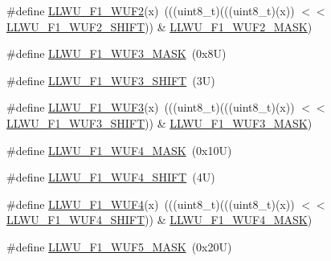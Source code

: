 \begin{DoxyCompactItemize}
\#define \mbox{\hyperlink{group___l_l_w_u___register___masks_ga7baf252acb15c1af560212b69c4510b2}{L\+L\+W\+U\+\_\+\+F1\+\_\+\+W\+U\+F2}}(x)~(((uint8\+\_\+t)(((uint8\+\_\+t)(x)) $<$$<$ \mbox{\hyperlink{group___l_l_w_u___register___masks_gab99e1778fd26ccd69f31a56d94709e41}{L\+L\+W\+U\+\_\+\+F1\+\_\+\+W\+U\+F2\+\_\+\+S\+H\+I\+FT}})) \& \mbox{\hyperlink{group___l_l_w_u___register___masks_gabc46629018d0f2eb7a39896eb5225933}{L\+L\+W\+U\+\_\+\+F1\+\_\+\+W\+U\+F2\+\_\+\+M\+A\+SK}})
\item 
\#define \mbox{\hyperlink{group___l_l_w_u___register___masks_ga7c81d1a3309d56f967355042ac08c299}{L\+L\+W\+U\+\_\+\+F1\+\_\+\+W\+U\+F3\+\_\+\+M\+A\+SK}}~(0x8\+U)
\item 
\#define \mbox{\hyperlink{group___l_l_w_u___register___masks_gada64305bc36dde8d293f511de2183d0c}{L\+L\+W\+U\+\_\+\+F1\+\_\+\+W\+U\+F3\+\_\+\+S\+H\+I\+FT}}~(3\+U)
\item 
\#define \mbox{\hyperlink{group___l_l_w_u___register___masks_ga239699d31d2e283bf2edce04eb6e4636}{L\+L\+W\+U\+\_\+\+F1\+\_\+\+W\+U\+F3}}(x)~(((uint8\+\_\+t)(((uint8\+\_\+t)(x)) $<$$<$ \mbox{\hyperlink{group___l_l_w_u___register___masks_gada64305bc36dde8d293f511de2183d0c}{L\+L\+W\+U\+\_\+\+F1\+\_\+\+W\+U\+F3\+\_\+\+S\+H\+I\+FT}})) \& \mbox{\hyperlink{group___l_l_w_u___register___masks_ga7c81d1a3309d56f967355042ac08c299}{L\+L\+W\+U\+\_\+\+F1\+\_\+\+W\+U\+F3\+\_\+\+M\+A\+SK}})
\item 
\#define \mbox{\hyperlink{group___l_l_w_u___register___masks_ga9dad2dc81874baa09dac37d10cc4781d}{L\+L\+W\+U\+\_\+\+F1\+\_\+\+W\+U\+F4\+\_\+\+M\+A\+SK}}~(0x10\+U)
\item 
\#define \mbox{\hyperlink{group___l_l_w_u___register___masks_ga4ce65dd6db7f89bd5e6f0fb7df47a399}{L\+L\+W\+U\+\_\+\+F1\+\_\+\+W\+U\+F4\+\_\+\+S\+H\+I\+FT}}~(4\+U)
\item 
\#define \mbox{\hyperlink{group___l_l_w_u___register___masks_ga9c07a536d420eeb46f7a757d4449f2ac}{L\+L\+W\+U\+\_\+\+F1\+\_\+\+W\+U\+F4}}(x)~(((uint8\+\_\+t)(((uint8\+\_\+t)(x)) $<$$<$ \mbox{\hyperlink{group___l_l_w_u___register___masks_ga4ce65dd6db7f89bd5e6f0fb7df47a399}{L\+L\+W\+U\+\_\+\+F1\+\_\+\+W\+U\+F4\+\_\+\+S\+H\+I\+FT}})) \& \mbox{\hyperlink{group___l_l_w_u___register___masks_ga9dad2dc81874baa09dac37d10cc4781d}{L\+L\+W\+U\+\_\+\+F1\+\_\+\+W\+U\+F4\+\_\+\+M\+A\+SK}})
\item 
\#define \mbox{\hyperlink{group___l_l_w_u___register___masks_ga2ba67283979e853e1601bd15a534523e}{L\+L\+W\+U\+\_\+\+F1\+\_\+\+W\+U\+F5\+\_\+\+M\+A\+SK}}~(0x20\+U)
\item 
$$
\end{DoxyCompactItemize}
